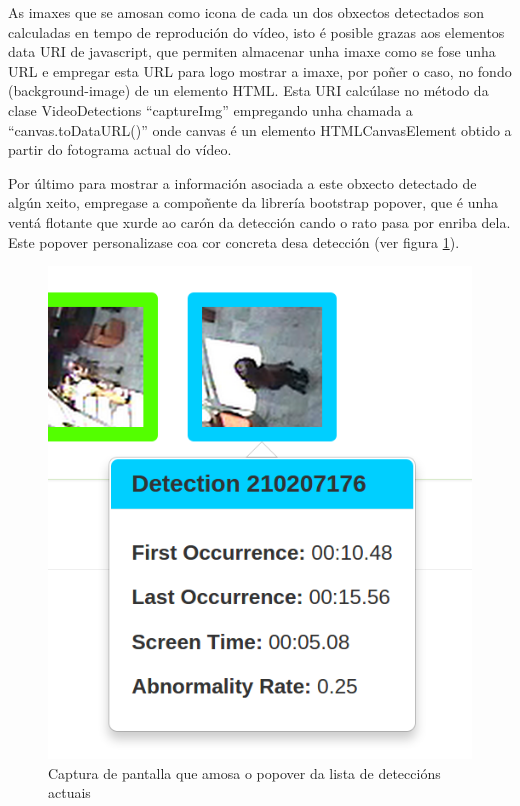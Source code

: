         As imaxes que se amosan como icona de cada un dos obxectos detectados son calculadas en tempo de
        reprodución do vídeo, isto é posible grazas aos elementos data URI\cite{data-uris} de javascript,
        que permiten almacenar unha imaxe como se fose unha URL e empregar esta URL para logo mostrar a 
        imaxe, por poñer o caso, no fondo (background-image) de un elemento HTML. Esta URI calcúlase 
        no método da clase VideoDetections ``captureImg'' empregando unha chamada a ``canvas.toDataURL()''
        onde canvas é un elemento HTMLCanvasElement obtido a partir do fotograma actual do vídeo.
        
        Por último para mostrar a información asociada a este obxecto detectado de algún xeito, 
        empregase a compoñente da librería bootstrap popover, que é unha ventá flotante que xurde ao
        carón da detección cando o rato pasa por enriba dela. Este popover personalizase coa cor 
        concreta desa detección (ver figura \ref{fig:popoverCapture}).
        
        \begin{figure}[htp]
        \begin{center}
            \includegraphics[scale=0.5]{figures/popoverCapture.png}
            \caption{Captura de pantalla que amosa o popover da lista de deteccións actuais}
        \label{fig:popoverCapture}
        \end{center}
        \end{figure}
        
